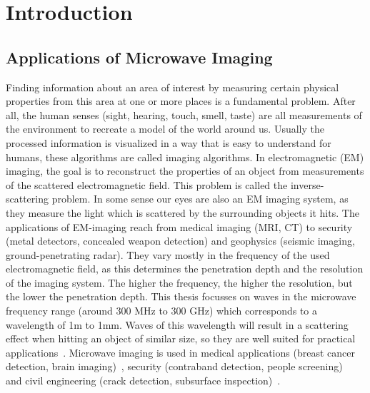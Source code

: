 
\chapter{Introduction}\label{chapter:introduction}

\section{Applications of Microwave Imaging}
Finding information about an area of interest by measuring certain physical properties from this area at one or more places is a fundamental problem.
After all, the human senses (sight, hearing, touch, smell, taste) are all measurements of the environment to recreate a model of the world around us.
Usually the processed information is visualized in a way that is easy to understand for humans, these algorithms are called imaging algorithms.
In electromagnetic (EM) imaging, the goal is to reconstruct the properties of an object from measurements of the scattered electromagnetic field.
This problem is called the inverse-scattering problem.
In some sense our eyes are also an EM imaging system, as they measure the light  which is scattered by the surrounding objects it hits.
The applications of EM-imaging reach from medical imaging (MRI, CT) to security (metal detectors, concealed weapon detection) and geophysics (seismic imaging, ground-penetrating radar).
They vary mostly in the frequency of the used electromagnetic field, as this determines the penetration depth and the resolution of the imaging system.
The higher the frequency, the higher the resolution, but the lower the penetration depth.
This thesis focusses on waves in the microwave frequency range (around 300 MHz to 300 GHz) which corresponds to a wavelength of 1m to 1mm.
Waves of this wavelength will result in a scattering effect when hitting an object of similar size, so they are well suited for practical applications~\parencite{pastorino_microwave_2018}.
Microwave imaging is used in medical applications (breast cancer detection, brain imaging)~\parencite{wang_medical_2014}, security (contraband detection, people screening)~\parencite{ahmed_microwave_2021} and civil engineering (crack detection, subsurface inspection)~\parencite{pastorino_microwave_2018}.

